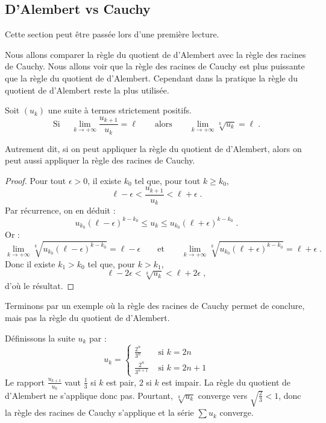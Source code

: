 \documentclass[class=report,crop=false]{standalone}
\begin{document}
\subsection{D'Alembert vs Cauchy}

Cette section peut être passée lors d'une première lecture.

\medskip

Nous allons comparer la règle du quotient de d'Alembert avec la règle des racines de Cauchy.
Nous allons voir que la règle des racines de Cauchy est plus puissante que la règle du quotient de d'Alembert.
Cependant dans la pratique la règle du quotient de d'Alembert reste la plus utilisée.


\begin{proposition}
\label{prop:cauchydalembert}
Soit $(u_k)$ une suite à termes strictement positifs.
$$
\text{Si } \quad \lim_{k\to+\infty} \frac{u_{k+1}}{u_k} = \ell
\qquad\text{alors}\qquad
\lim_{k\to+\infty} \sqrt[k]{u_k} = \ell\;.
$$
\end{proposition} 
Autrement dit, si on peut appliquer la règle du quotient de d'Alembert, alors on peut aussi appliquer 
la règle des racines de Cauchy.

\begin{proof}
Pour tout $\epsilon>0$, il existe $k_0$ tel que, pour tout $k\ge k_0$,
$$\ell-\epsilon < \frac{u_{k+1}}{u_k} < \ell+\epsilon\;.$$
Par récurrence, on en déduit :
$$u_{k_0}(\ell-\epsilon)^{k-k_0} \le u_k \le u_{k_0} (\ell+\epsilon)^{k-k_0}\;.$$
Or :
$$\lim_{k\to+\infty}\sqrt[k]{u_{k_0}(\ell-\epsilon)^{k-k_0}}
= \ell-\epsilon
\qquad\text{et}\qquad
\lim_{k\to+\infty}\sqrt[k]{u_{k_0}(\ell+\epsilon)^{k-k_0}}
= \ell+\epsilon\;.$$
Donc il existe $k_1>k_0$ tel que, pour $k>k_1$,
$$\ell-2\epsilon < \sqrt[k]{u_k} < \ell + 2\epsilon\;,$$
d'où le résultat.
\end{proof}

\bigskip
 
Terminons par un exemple où la règle des racines de Cauchy permet de conclure, 
mais pas la règle du quotient de d'Alembert.
\begin{exemple}
Définissons la suite $u_k$ par :
$$
u_k = \left\{
\begin{array}{ll}
\frac{2^n}{3^n}&\text{ si } k=2n\\[2ex]
\frac{2^n}{3^{n+1}}&\text{ si } k=2n+1
\end{array}
\right.
$$
Le rapport $\frac{u_{k+1}}{u_k}$ vaut $\frac{1}{3}$ si $k$ est pair,
$2$ si $k$ est impair. La règle du quotient de d'Alembert ne s'applique donc pas. 
Pourtant, $\sqrt[k]{u_k}$ converge vers $\sqrt{\frac{2}{3}}<1$,
donc la règle des racines de Cauchy s'applique et la série $\sum u_k$ converge.  
\end{exemple}
\end{document}

